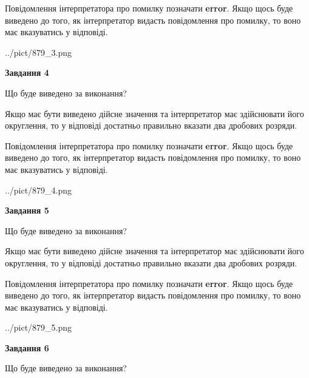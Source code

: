 \documentclass[12pt, ukrainian]{article}
\begin{document}
{\begin {Large}
Повідомлення інтерпретатора про помилку позначати \textbf{error}.
Якщо щось буде виведено до того, як інтерпретатор видасть повідомлення про помилку, 
то воно має вказуватись у відповіді. \par

\begin{center}
	{../pict/879_3.png}
\end{center}
\newpage

{\begin {center}\textbf{Завдання 4}\end {center}}\par
Що буде виведено за виконання? \par

Якщо має бути виведено дійсне значення та інтерпретатор має здійснювати його округлення, 
то у відповіді достатньо правильно вказати два дробових розряди.

Повідомлення інтерпретатора про помилку позначати \textbf{error}.
Якщо щось буде виведено до того, як інтерпретатор видасть повідомлення про помилку, 
то воно має вказуватись у відповіді. \par

\begin{center}
	{../pict/879_4.png}
\end{center}
\newpage

{\begin {center}\textbf{Завдання 5}\end {center}}\par
Що буде виведено за виконання? \par

Якщо має бути виведено дійсне значення та інтерпретатор має здійснювати його округлення, 
то у відповіді достатньо правильно вказати два дробових розряди.

Повідомлення інтерпретатора про помилку позначати \textbf{error}.
Якщо щось буде виведено до того, як інтерпретатор видасть повідомлення про помилку, 
то воно має вказуватись у відповіді. \par

\begin{center}
	{../pict/879_5.png}
\end{center}
\newpage

{\begin {center}\textbf{Завдання 6}\end {center}}\par
Що буде виведено за виконання? \par


\end{Large}}
\end{document}
